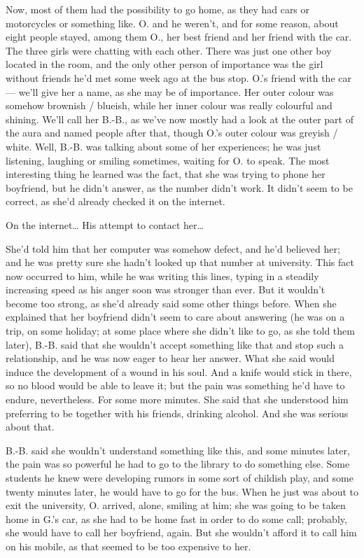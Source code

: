 Now, most of them had the possibility to go home, as they had cars or motorcycles or something like. 
O. and he weren't, and for some reason, about eight people stayed, among them O., her best friend and her friend with the car. 
The three girls were chatting with each other. There was just one other boy located in the room, and the only other person of importance was the girl without friends he'd met some week ago at the bus stop. 
O.'s friend with the car --- we'll give her a name, as she may be of importance. Her outer colour was somehow brownish / blueish, while her inner colour was really colourful and shining. 
We'll call her B.-B., as we've now mostly had a look at the outer part of the aura and named people after that, though O.'s outer colour was greyish / white. 
Well, B.-B. was talking about some of her experiences; he was just listening, laughing or smiling sometimes, waiting for O. to speak. 
The most interesting thing he learned was the fact, that she was trying to phone her boyfriend, but he didn't answer, as the number didn't work. It didn't seem to be correct, as she'd already checked it on the internet.

On the internet\ldots
His attempt to contact her\ldots

She'd told him that her computer was somehow defect, and he'd believed her; and he was pretty sure she hadn't looked up that number at university. 
This fact now occurred to him, while he was writing this lines, typing in a steadily increasing speed as his anger soon was stronger than ever. 
But it wouldn't become too strong, as she'd already said some other things before. When she explained that her boyfriend didn't seem to care about answering (he was on a trip, on some holiday; at some place where she didn't like to go, as she told them later), B.-B. said that she wouldn't accept something like that and stop such a relationship, and he was now eager to hear her answer. What she said would induce the development of a wound in his soul.
And a knife would stick in there, so no blood would be able to leave it; but the pain was something he'd have to endure, nevertheless. 
For some more minutes. 
She said that she understood him preferring to be together with his friends, drinking alcohol. 
And she was serious about that.

B.-B. said she wouldn't understand something like this, and some minutes later, the pain was so powerful he had to go to the library to do something else. 
Some students he knew were developing rumors in some sort of childish play, and some twenty minutes later, he would have to go for the bus. When he just was about to exit the university, O. arrived, alone, smiling at him; she was going to be taken home in G.'s car, as she had to be home fast in order to do some call; probably, she would have to call her boyfriend, again. 
But she wouldn't afford it to call him on his mobile, as that seemed to be too expensive to her.

